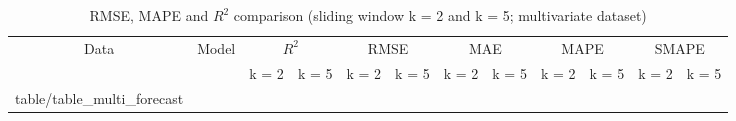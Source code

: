 \documentclass[review,3p,authoryear]{elsarticle}
\makeatletter
\newcommand\primitiveinput[1]
		{\@@input #1 }
\makeatother
\begin{document}
{%



\begin{table}[h]
	\caption{RMSE, MAPE and $R^2$ comparison (sliding window k = 2 and k = 5; multivariate dataset)}
	\label{table:multi_forecast}
	\centering
	\begin{adjustbox}{width=\textwidth}
		\begin{tabular}{| c | c | c | c | c | c | c | c | c | c | c | c |}%
			\hline
			\multirow{2}{*}{Data} & \multirow{2}{*}{Model} & \multicolumn{2}{c|}{$R^2$} & \multicolumn{2}{c|}{RMSE} & \multicolumn{2}{c|}{MAE} & \multicolumn{2}{c|}{MAPE}  & \multicolumn{2}{c|}{SMAPE} \\ \cline{3-12}
   				& & k = 2 & k = 5 & k = 2 & k = 5 & k = 2 & k = 5 & k = 2 & k = 5 & k = 2 & k = 5 \\ [0.5ex] 
			\hline
			\primitiveinput{table/table_multi_forecast}
			\hline
		\end{tabular}
	\end{adjustbox}
\end{table}


}
\end{document}
